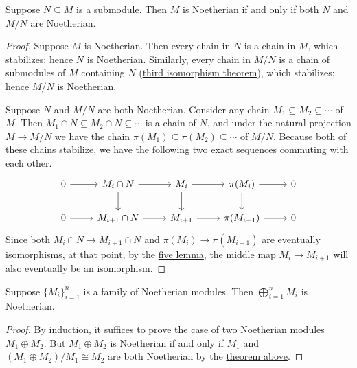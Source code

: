 \begin{theorem}\label{thm:noetherian-quotient}
    Suppose \(N \subseteq M\) is a submodule.
    Then \(M\) is Noetherian if and only if both \(N\) and \(M/N\) are Noetherian.
\end{theorem}
\begin{proof}
    Suppose \(M\) is Noetherian.
    Then every chain in \(N\) is a chain in \(M\), which stabilizes; hence \(N\) is Noetherian.
    Similarly, every chain in \(M/N\) is a chain of submodules of \(M\) containing \(N\) (\hyperref[thm:iso-3-mod]{third isomorphism theorem}),
    which stabilizes; hence \(M/N\) is Noetherian.

    Suppose \(N\) and \(M/N\) are both Noetherian.
    Consider any chain \(M_1 \subseteq M_2 \subseteq \cdots\) of \(M\).
    Then \(M_1 \cap N \subseteq M_2 \cap N \subseteq \cdots\) is a chain of \(N\),
    and under the natural projection \(M \to M/N\)
    we have the chain \(\pi(M_1) \subseteq \pi(M_2) \subseteq \cdots\) of \(M/N\).
    Because both of these chains stabilize,
    we have the following two exact sequences commuting with each other.
    \begin{equation*}
        \begin{tikzcd}
            0 \arrow{r} & M_i \cap N \arrow{r} \arrow{d} & M_i \arrow{r} \arrow{d} & \pi(M_i) \arrow{r} \arrow{d} & 0 \\
            0 \arrow{r} & M_{i+1} \cap N \arrow{r} & M_{i+1} \arrow{r} & \pi(M_{i+1}) \arrow{r} & 0
        \end{tikzcd}
    \end{equation*}
    Since both \(M_i \cap N \to M_{i+1} \cap N\) and \(\pi(M_i) \to \pi(M_{i+1})\) are eventually isomorphisms,
    at that point, by the \hyperref[lem:five]{five lemma},
    the middle map \(M_i \to M_{i+1}\) will also eventually be an isomorphism.
\end{proof}
\begin{corollary}\label{cor:direct-sum-noetherian}
    Suppose \({\{M_i\}}_{i=1}^n\) is a family of Noetherian modules.
    Then \(\bigoplus_{i=1}^n M_i\) is Noetherian.
\end{corollary}
\begin{proof}
    By induction, it suffices to prove the case of two Noetherian modules \(M_1 \oplus M_2\).
    But \(M_1 \oplus M_2\) is Noetherian if and only if \(M_1\) and \((M_1 \oplus M_2)/M_1 \cong M_2\) are both Noetherian
    by the \hyperref[thm:noetherian-quotient]{theorem above}.
\end{proof}
